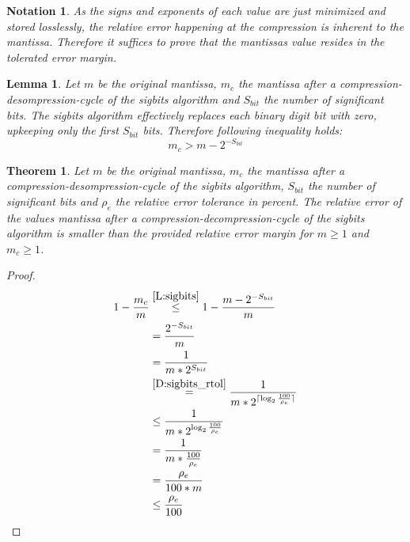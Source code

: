 \documentclass[
	12pt,
	a4paper,
	BCOR10mm,
	DIV14,
	headsepline,
]{scrreprt}
\newtheorem{theorem}{Theorem}
\newtheorem{lemma}{Lemma}
\newtheorem{notation}{Notation}
\DeclarePairedDelimiter{\ceil}{\lceil}{\rceil}
\begin{document}
\bigskip

\begin{notation} \label{N:sigbits}
	As the signs and exponents of each value are just minimized and stored
	losslessly, the relative error happening at the compression is inherent to the
	mantissa. Therefore it suffices to prove that the mantissas value resides in
	the tolerated error margin.
\end{notation}

\bigskip

\begin{lemma} \label{L:sigbits}
	Let $m$ be the original mantissa, $m_c$ the mantissa after a
	compression-desompression-cycle of the sigbits algorithm and $S_{bit}$ the
	number of significant bits. The sigbits algorithm effectively replaces each
	binary digit bit with zero, upkeeping only the first $S_{bit}$ bits.
	Therefore following inequality holds:
	\[
		m_c > m - 2^{-S_{bit}}
	\]
\end{lemma}

\clearpage

\begin{theorem} \label{T:sigbits}
	Let $m$ be the original mantissa, $m_c$ the mantissa after a
	compression-desompression-cycle of the sigbits algorithm, $S_{bit}$ the
	number of significant bits and $\rho_e$ the relative error tolerance in
	percent. The relative error of the values mantissa after a
	compression-decompression-cycle of the sigbits algorithm is smaller than
	the provided relative error margin for $m\ge 1$ and $m_c\ge 1$.
\end{theorem}

\begin{proof}
	\begingroup
	\addtolength{\jot}{1em}
	\begin{align*}
		1 - \frac{m_c}{m}
		&\stackrel{\ref{L:sigbits}}{\le}1 - \frac{m-2^{-S_{bit}}}{m} \\
	  	&=\frac{2^{-S_{bit}}}{m} \\
		&=\frac{1}{m * 2^{S_{bit}}} \\
	  	&\stackrel{\ref{D:sigbits_rtol}}{=}\frac{1}{m * 2^{
				\ceil{
					\log_2{\frac{100}{\rho_{e}}}
				}
			}} \\
	  	&\le \frac{1}{m * 2^{
				\log_2{\frac{100}{\rho_{e}}}
			}} \\
	  	&=\frac{1}{m * \frac{100}{\rho_{e}}} \\
		&=\frac{\rho_e}{100 * m} \\
	  	&\le \frac{\rho_e}{100} \qedhere
	\end{align*}
	\endgroup
\end{proof}
\end{document}
